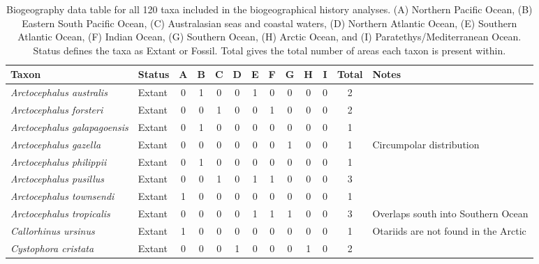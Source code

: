 \begin{longtable}{llccccccccccp{}}

\caption{Biogeography data table for all 120 taxa included in the biogeographical history analyses. (A) Northern Pacific Ocean, (B) Eastern South Pacific Ocean, (C) Australasian seas and coastal waters, (D) Northern Atlantic Ocean, (E) Southern Atlantic Ocean, (F) Indian Ocean, (G) Southern Ocean, (H) Arctic Ocean, and (I) Paratethys/Mediterranean Ocean. Status defines the taxa as Extant or Fossil. Total gives the total number of areas each taxon is present within.}\\

\hline
\textbf{Taxon} & \textbf{Status} & \textbf{A} & \textbf{B} & \textbf{C} & \textbf{D} & \textbf{E} & \textbf{F}
& \textbf{G} & \textbf{H} & \textbf{I} & \textbf{Total} & \textbf{Notes}\\
\hline 
\textit{Arctocephalus australis} &
Extant  &
0 &
1 &
0 &
0 &
1 &
0 &
0 &
0 &
0 &
2  &
\\

\textit{Arctocephalus forsteri} &
Extant  &
0 &
0 &
1 &
0 &
0 &
1 &
0 &
0 &
0 &
2  &
\\

\textit{Arctocephalus galapagoensis} &
Extant &
0 &
1 &
0 &
0 &
0 &
0 &
0 &
0 &
0 &
1 &
\\

\textit{Arctocephalus gazella} &
Extant &
0 &
0 &
0 &
0 &
0 &
0 &
1 &
0 &
0 &
1 &
Circumpolar distribution\\

\textit{Arctocephalus philippii} &
Extant &
0 &
1 &
0 &
0 &
0 &
0 &
0 &
0 &
0 &
1 &
\\

\textit{Arctocephalus pusillus} &
Extant &
0 &
0 &
1 &
0 &
1 &
1 &
0 &
0 &
0 &
3 &
\\

\textit{Arctocephalus townsendi} &
Extant &
1 &
0 &
0 &
0 &
0 &
0 &
0 &
0 &
0 &
1 &
\\

\textit{Arctocephalus tropicalis} &
Extant &
0 &
0 &
0 &
0 &
1 &
1 &
1 &
0 &
0 &
3 &
Overlaps south into Southern Ocean\\

\textit{Callorhinus ursinus} &
Extant &
1 &
0 &
0 &
0 &
0 &
0 &
0 &
0 &
0 &
1 &
Otariids are not found in the Arctic\\

\textit{Cystophora cristata} &
Extant &
0 &
0 &
0 &
1 &
0 &
0 &
0 &
1 &
0 &
2 &
\\


\end{longtable}
